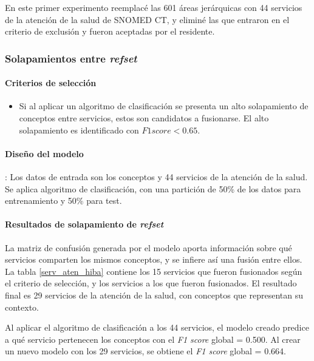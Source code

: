 En este primer experimento reemplacé las 601 áreas jerárquicas con 44 servicios de la atención de la salud de SNOMED CT, y eliminé las que entraron en el criterio de exclusión y fueron aceptadas por el residente.

\subsubsection{Solapamientos entre \textit{refset}}

\paragraph{Criterios de selección}
\begin{itemize}
\item Si al aplicar un algoritmo de clasificación se presenta un alto solapamiento de conceptos entre servicios, estos son candidatos a fusionarse. El alto solapamiento es identificado con $F1 score < 0.65$.
\end{itemize}

\paragraph{Diseño del modelo}: 
Los datos de entrada son los conceptos y 44  servicios de la atención de la salud. Se aplica algoritmo de clasificación, con  una partición de 50\% de los datos para  entrenamiento y 50\% para test.
 
\paragraph{Resultados de solapamiento de \textit{\acrshort{refset}}}
 La matriz de confusión generada por el modelo aporta información sobre qué servicios comparten los mismos conceptos, y se infiere así una fusión entre ellos. La tabla \ref{serv_aten_hiba} contiene los 15 servicios que fueron fusionados según el criterio de selección, y los servicios a los que fueron fusionados.  El resultado final es 29 servicios de la atención de la salud, con conceptos que representan su contexto.
 
Al aplicar el algoritmo de clasificación a los 44 servicios, el modelo creado predice a qué servicio pertenecen los conceptos con el \textit{F1 score} global = 0.500.  Al crear un nuevo modelo con los 29 servicios, se obtiene el   \textit{F1 score}  global = 0.664.

